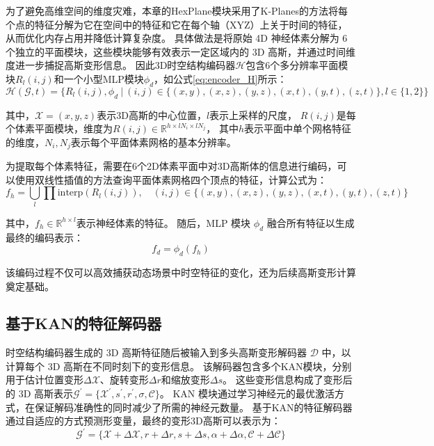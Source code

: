 为了避免高维空间的维度灾难，本章的HexPlane模块采用了K-Planes\cite{k-planes}的方法将每个点的特征分解为它在空间中的特征和它在每个轴（XYZ）上关于时间的特征，从而优化内存占用并降低计算复杂度。
具体做法是将原始 4D 神经体素分解为 6 个独立的平面模块，这些模块能够有效表示一定区域内的 3D 高斯，并通过时间维度进一步捕捉高斯变形信息。
因此3D时空结构编码器$\mathcal{H}$包含6个多分辨率平面模块$R_l(i,j)$和一个小型MLP模块$\phi_d$，如公式\ref{eq:encoder_H}所示：
\begin{equation}
\label{eq:encoder_H}
\mathcal{H}(\mathcal{G}, t) = \{ R_l(i,j), \phi_d \ | \ (i,j) \in \{(x,y), (x,z), (y,z), (x,t), (y,t), (z,t)\}, l \in \{1, 2\} \}
\end{equation}

其中，$\mathcal{X} = (x, y, z)$表示3D高斯的中心位置，$l$表示上采样的尺度，
$R(i,j)$是每个体素平面模块，维度为$R(i,j) \in \mathbb{R}^{h \times l N_i \times l N_j}$，
其中$h$表示平面中单个网格特征的维度，$N_i,N_j$表示每个平面体素网格的基本分辨率。

为提取每个体素特征，需要在6个2D体素平面中对3D高斯体的信息进行编码，可以使用双线性插值的方法查询平面体素网格四个顶点的特征，计算公式为：
\begin{equation}
f_h = \bigcup_l \prod \text{interp}(R_l(i,j)), \quad (i,j) \in \{(x,y),(x,z),(y,z),(x,t),(y,t),(z,t)\}
\end{equation}

其中，$f_h \in \mathbb{R}^{h \times l}$表示神经体素的特征。
随后，MLP 模块 $\phi_d$ 融合所有特征以生成最终的编码表示：
\begin{equation}
f_d = \phi_d(f_h)
\end{equation}  

该编码过程不仅可以高效捕获动态场景中时空特征的变化，还为后续高斯变形计算奠定基础。

\subsection{基于KAN的特征解码器}
时空结构编码器生成的 3D 高斯特征随后被输入到多头高斯变形解码器 $\mathcal{D}$ 中，以计算每个 3D 高斯在不同时刻下的变形信息。
该解码器包含多个KAN模块，分别用于估计位置变形$\Delta \mathcal{X}$、旋转变形$\Delta r$和缩放变形$\Delta s$。
这些变形信息构成了变形后的 3D 高斯表示$\mathcal{G}^\prime=\{\mathcal{X}^\prime, s^\prime, r^\prime, \sigma, \mathcal{C} \}$。
KAN 模块通过学习神经元的最优激活方式，在保证解码准确性的同时减少了所需的神经元数量。
基于KAN的特征解码器通过自适应的方式预测形变量，最终的变形3D高斯可以表示为：
\begin{equation}
    \mathcal{G}^\prime = \{ \mathcal{X} + \Delta \mathcal{X}, r + \Delta r, s + \Delta s, \alpha + \Delta \alpha, \mathcal{C} + \Delta \mathcal{C} \}
\end{equation}

